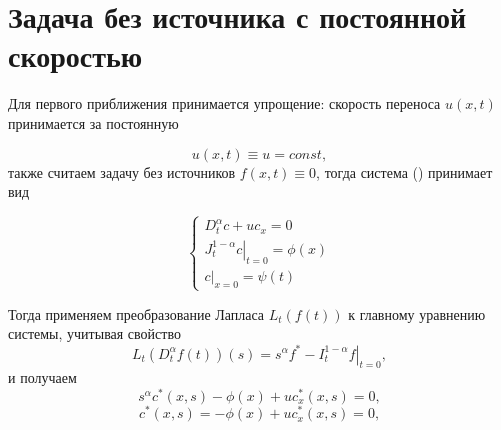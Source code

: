 \section{Задача без источника с постоянной скоростью}

Для первого приближения принимается упрощение: скорость переноса $u(x,t)$ принимается за постоянную

\begin{equation}
	u(x,t) \equiv u = const,
\end{equation}
также считаем задачу без источников $f(x,t)\equiv0$, тогда система (\label{eq:def_0}) принимает вид

\begin{equation}
	\label{eq:an_0}
	\begin{cases}
		D^\alpha_t c + uc_x = 0\\
		\left.J^{1-\alpha}_tc\right|_{t=0} = \phi(x)\\
		\left.c\right|_{x=0}=\psi(t)
	\end{cases}
\end{equation}

Тогда применяем преобразование Лапласа $L_t(f(t))$ к главному уравнению системы, учитывая свойство
\begin{equation}
	L_t(D^\alpha_tf(t))(s) = s^\alpha f^* - \left. I^{1-\alpha}_tf \right|_{t=0},
\end{equation}
и получаем
\begin{equation}
	s^\alpha c^*(x,s) - \phi(x) + u c^*_x(x,s) = 0,
\end{equation}
\begin{equation}
	c^*(x,s) = - \phi(x) + u c^*_x(x,s) = 0,
\end{equation}